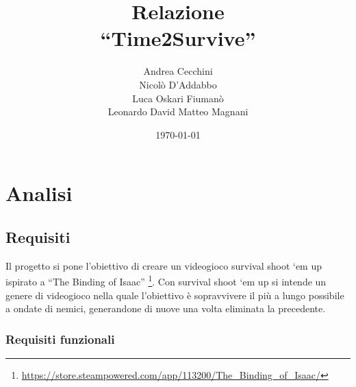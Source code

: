 \documentclass[a4paper,12pt]{report}
\title{Relazione \\``Time2Survive''}
\author{Andrea Cecchini \\ Nicolò D'Addabbo \\ Luca Oskari Fiumanò \\Leonardo David Matteo Magnani}
\date{\today}
\begin{document}
\maketitle

\tableofcontents

\chapter{Analisi}

\section{Requisiti}
Il progetto si pone l’obiettivo di creare un videogioco survival shoot ‘em up ispirato a ``The Binding of Isaac'' \footnote{\url{https://store.steampowered.com/app/113200/The_Binding_of_Isaac/}}.
Con survival shoot ‘em up si intende un genere di videogioco nella quale l’obiettivo è sopravvivere il più a lungo possibile a ondate di nemici, generandone di nuove una volta eliminata la precedente.

\subsection*{Requisiti funzionali}
\end{document}
